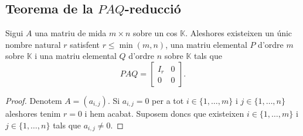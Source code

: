 \documentclass[../Apunts.tex]{subfiles}
\begin{document}
	\subsection{Teorema de la \texorpdfstring{\(PAQ\)}{}-reducció}
	\begin{theorem}
		\label{thm:Teorema de la PAQ-reducció}
		Sigui \(A\) una matriu de mida \(m\times n\) sobre un cos \(\mathbb{K}\). Aleshores existeixen un únic nombre natural \(r\) satisfent \(r\leq\min(m,n)\), una matriu elemental \(P\) d'ordre \(m\) sobre \(\mathbb{K}\) i una matriu elemental \(Q\) d'ordre \(n\) sobre \(\mathbb{K}\) tals que
		\[PAQ=\left[\begin{array}{c|c}
		I_{r} & 0\\\hline
		0 & 0
		\end{array}\right].\]
		\begin{proof}
			Denotem \(A=(a_{i,j})\). Si \(a_{i,j}=0\) per a tot \(i\in\{1,\dots,m\}\) i \(j\in\{1,\dots,n\}\) aleshores tenim \(r=0\) i hem acabat. Suposem doncs que existeixen \(i\in\{1,\dots,m\}\) i \(j\in\{1,\dots,n\}\) tals que \(a_{i,j}\neq0\).
			

\end{proof}
\end{theorem}
\end{document}
